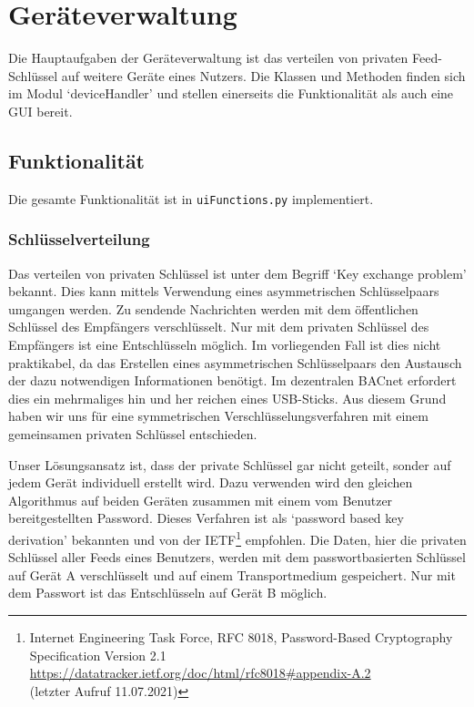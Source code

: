 \documentclass[a4paper,titlepage]{article}
\newcommand{\ilc}[1]{\textcolor{codeColor}{\texttt{#1}}}
\begin{document}
\section{Geräteverwaltung}
Die Hauptaufgaben der Geräteverwaltung ist das verteilen von privaten Feed-Schlüssel auf weitere Geräte eines Nutzers. Die Klassen und Methoden finden sich im Modul `deviceHandler' und stellen einerseits die Funktionalität als auch eine GUI bereit.

\subsection{Funktionalität}
Die gesamte Funktionalität ist in \ilc{uiFunctions.py} implementiert. 

\subsubsection*{Schlüsselverteilung}
Das verteilen von privaten Schlüssel ist unter dem Begriff `Key exchange problem' bekannt. Dies kann mittels Verwendung eines asymmetrischen Schlüsselpaars umgangen werden. Zu sendende Nachrichten werden mit dem öffentlichen Schlüssel des Empfängers verschlüsselt. Nur mit dem privaten Schlüssel des Empfängers ist eine Entschlüsseln möglich. Im vorliegenden Fall ist dies nicht praktikabel, da das Erstellen eines asymmetrischen Schlüsselpaars den Austausch der dazu notwendigen Informationen benötigt. Im dezentralen BACnet erfordert dies ein mehrmaliges hin und her reichen eines USB-Sticks. Aus diesem Grund haben wir uns für eine symmetrischen Verschlüsselungsverfahren mit einem gemeinsamen privaten Schlüssel entschieden. 

Unser Lösungsansatz ist, dass der private Schlüssel gar nicht geteilt, sonder auf jedem Gerät individuell erstellt wird. Dazu verwenden wird den gleichen Algorithmus auf beiden Geräten zusammen mit einem vom Benutzer bereitgestellten Password. Dieses Verfahren ist als `password based key derivation' bekannten und von der IETF\footnote{Internet Engineering Task Force, RFC 8018, Password-Based Cryptography Specification Version 2.1\\ \url{https://datatracker.ietf.org/doc/html/rfc8018\#appendix-A.2} \\ (letzter Aufruf 11.07.2021)} empfohlen. Die Daten, hier die privaten Schlüssel aller Feeds eines Benutzers, werden mit dem passwortbasierten Schlüssel auf Gerät A verschlüsselt und auf einem Transportmedium gespeichert. Nur mit dem Passwort ist das Entschlüsseln auf Gerät B möglich.
\end{document}
